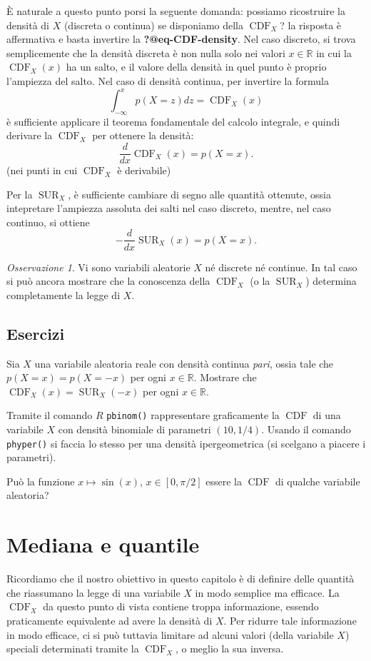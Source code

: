 \documentclass[
  italian,
  letterpaper,
]{book}
\newcommand{\R}{\mathbb{R}}
\newcommand{\SUR}{\operatorname{SUR}}
\newcommand{\CDF}{\operatorname{CDF}}
\theoremstyle{definition}
\theoremstyle{remark}
\newtheorem*{remark}{Osservazione}
\begin{document}
È naturale a questo punto porsi la seguente domanda: possiamo
ricostruire la densità di \(X\) (discreta o continua) se disponiamo
della \(\CDF_X\)? la risposta è affermativa e basta invertire la
\textbf{?@eq-CDF-density}. Nel caso discreto, si trova semplicemente che
la densità discreta è non nulla solo nei valori \(x\in \R\) in cui la
\(\CDF_X(x)\) ha un salto, e il valore della densità in quel punto è
proprio l'ampiezza del salto. Nel caso di densità continua, per
invertire la formula \[ \int_{-\infty}^x p(X=z)dz = \CDF_X(x)\] è
sufficiente applicare il teorema fondamentale del calcolo integrale, e
quindi derivare la \(\CDF_X\) per ottenere la densità:
\[ \frac{d}{dx} \CDF_X(x) = p(X=x).\] (nei punti in cui \(\CDF_X\) è
derivabile)

Per la \(\SUR_X\), è sufficiente cambiare di segno alle quantità
ottenute, ossia intepretare l'ampiezza assoluta dei salti nel caso
discreto, mentre, nel caso continuo, si ottiene
\[ - \frac{d}{dx} \SUR_X(x) = p(X=x).\]

\begin{remark}
Vi sono variabili aleatorie \(X\) né discrete né continue. In tal caso
si può ancora mostrare che la conoscenza della \(\CDF_X\) (o la
\(\SUR_X\)) determina completamente la legge di \(X\).
\end{remark}

\subsection{Esercizi}\label{esercizi-17}

Sia \(X\) una variabile aleatoria reale con densità continua
\emph{pari}, ossia tale che \(p(X=x)  = p(X =-x)\) per ogni
\(x \in \R\). Mostrare che \(\CDF_X(x) = \SUR_X(-x)\) per ogni
\(x \in \R\).

Tramite il comando \(R\) \texttt{pbinom()} rappresentare graficamente la
\(\CDF\) di una variabile \(X\) con densità binomiale di parametri
\((10, 1/4)\). Usando il comando \texttt{phyper()} si faccia lo stesso
per una densità ipergeometrica (si scelgano a piacere i parametri).

Può la funzione \(x\mapsto \sin(x)\), \(x \in [0, \pi/2]\) essere la
\(\CDF\) di qualche variabile aleatoria?

\section{Mediana e quantile}\label{sec-mediana}

Ricordiamo che il nostro obiettivo in questo capitolo è di definire
delle quantità che riassumano la legge di una variabile \(X\) in modo
semplice ma efficace. La \(\CDF_X\) da questo punto di vista contiene
troppa informazione, essendo praticamente equivalente ad avere la
densità di \(X\). Per ridurre tale informazione in modo efficace, ci si
può tuttavia limitare ad alcuni valori (della variabile \(X\)) speciali
determinati tramite la \(\CDF_X\), o meglio la sua inversa.
\end{document}
